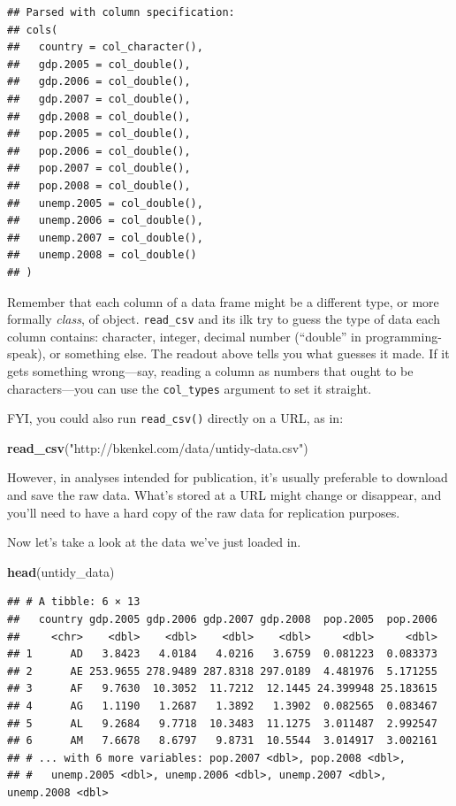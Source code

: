 \documentclass[12pt,oneside,openany]{book}
\newenvironment{Shaded}{\begin{snugshade}}{\end{snugshade}}
\newcommand{\KeywordTok}[1]{\textcolor[rgb]{0.13,0.29,0.53}{\textbf{#1}}}
\newcommand{\StringTok}[1]{\textcolor[rgb]{0.31,0.60,0.02}{#1}}
\newcommand{\NormalTok}[1]{#1}
\begin{document}
\begin{verbatim}
## Parsed with column specification:
## cols(
##   country = col_character(),
##   gdp.2005 = col_double(),
##   gdp.2006 = col_double(),
##   gdp.2007 = col_double(),
##   gdp.2008 = col_double(),
##   pop.2005 = col_double(),
##   pop.2006 = col_double(),
##   pop.2007 = col_double(),
##   pop.2008 = col_double(),
##   unemp.2005 = col_double(),
##   unemp.2006 = col_double(),
##   unemp.2007 = col_double(),
##   unemp.2008 = col_double()
## )
\end{verbatim}

Remember that each column of a data frame might be a different type, or
more formally \emph{class}, of object. \texttt{read\_csv} and its ilk
try to guess the type of data each column contains: character, integer,
decimal number (``double'' in programming-speak), or something else. The
readout above tells you what guesses it made. If it gets something
wrong---say, reading a column as numbers that ought to be
characters---you can use the \texttt{col\_types} argument to set it
straight.

FYI, you could also run \texttt{read\_csv()} directly on a URL, as in:

\begin{Shaded}
\begin{Highlighting}[]
\KeywordTok{read_csv}\NormalTok{(}\StringTok{"http://bkenkel.com/data/untidy-data.csv"}\NormalTok{)}
\end{Highlighting}
\end{Shaded}

However, in analyses intended for publication, it's usually preferable
to download and save the raw data. What's stored at a URL might change
or disappear, and you'll need to have a hard copy of the raw data for
replication purposes.

Now let's take a look at the data we've just loaded in.

\begin{Shaded}
\begin{Highlighting}[]
\KeywordTok{head}\NormalTok{(untidy_data)}
\end{Highlighting}
\end{Shaded}

\begin{verbatim}
## # A tibble: 6 × 13
##   country gdp.2005 gdp.2006 gdp.2007 gdp.2008  pop.2005  pop.2006
##     <chr>    <dbl>    <dbl>    <dbl>    <dbl>     <dbl>     <dbl>
## 1      AD   3.8423   4.0184   4.0216   3.6759  0.081223  0.083373
## 2      AE 253.9655 278.9489 287.8318 297.0189  4.481976  5.171255
## 3      AF   9.7630  10.3052  11.7212  12.1445 24.399948 25.183615
## 4      AG   1.1190   1.2687   1.3892   1.3902  0.082565  0.083467
## 5      AL   9.2684   9.7718  10.3483  11.1275  3.011487  2.992547
## 6      AM   7.6678   8.6797   9.8731  10.5544  3.014917  3.002161
## # ... with 6 more variables: pop.2007 <dbl>, pop.2008 <dbl>,
## #   unemp.2005 <dbl>, unemp.2006 <dbl>, unemp.2007 <dbl>, unemp.2008 <dbl>
\end{verbatim}
\end{document}

